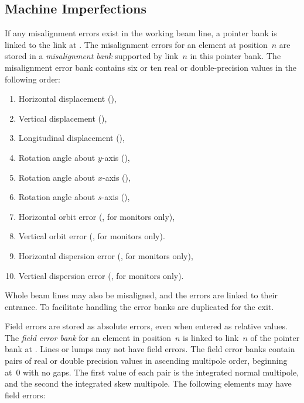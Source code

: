 \clearpage
 
\subsection{Machine Imperfections}
\label{Serr}
 
If any misalignment errors exist in the working beam line,
a pointer bank is linked to the link at .
The misalignment errors for an element at position~$n$ are stored in a
{\em misalignment bank} supported by link~$n$
in this pointer bank.
The misalignment error bank contains six or ten real or
double-precision values in the following order:
\begin{enumerate}
\item
Horizontal displacement (),
\item
Vertical displacement (),
\item
Longitudinal displacement (),
\item
Rotation angle about $y$-axis (),
\item
Rotation angle about $x$-axis (),
\item
Rotation angle about $s$-axis (),
\item
Horizontal orbit error (, for monitors only),
\item
Vertical orbit error (, for monitors only).
\item
Horizontal dispersion error (, for monitors only),
\item
Vertical dispersion error (, for monitors only).
\end{enumerate}
Whole beam lines may also be misaligned, and the errors are linked
to their entrance.
To facilitate handling the error banks are duplicated for the exit.
 
Field errors are stored as absolute errors,
even when entered as relative values.
The {\em field error bank} for an element in position~$n$ is
linked to link~$n$ of the pointer bank at .
Lines or lumps may not have field errors.
The field error banks contain pairs of real or double precision values
in ascending multipole order, beginning at~$0$ with no gaps.
The first value of each pair is the integrated normal multipole,
and the second the integrated skew multipole.
The following elements may have field errors:
 
